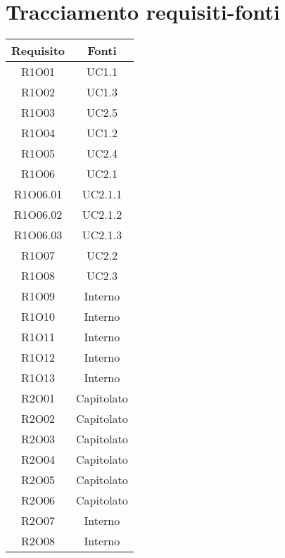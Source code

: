 \section{Tracciamento requisiti-fonti}
\begin{tabularx}{\textwidth}{|C|C|}
	\hline
	\textbf{Requisito} & \textbf{Fonti} \\
	\hline
	R1O01& UC1.1\\
	\hline
	R1O02& UC1.3\\
	\hline
	R1O03& UC2.5\\
	\hline
	R1O04& UC1.2\\
	\hline
	R1O05& UC2.4\\
	\hline
	R1O06& UC2.1\\
	\hline
	R1O06.01& UC2.1.1\\
	\hline
	R1O06.02& UC2.1.2\\
	\hline
	R1O06.03& UC2.1.3\\
	\hline
	R1O07& UC2.2\\
	\hline	
	R1O08& UC2.3\\
	\hline	
	R1O09& Interno\\
	\hline	
	R1O10& Interno\\
	\hline
	R1O11& Interno\\
	\hline	
	R1O12& Interno\\
	\hline
	R1O13& Interno\\
	\hline
	R2O01 &Capitolato\\
	\hline
	R2O02 &Capitolato\\
	\hline
	R2O03 &Capitolato\\
	\hline
	R2O04 &Capitolato\\
	\hline
	R2O05 &Capitolato\\
	\hline
	R2O06 &Capitolato\\
	\hline
	R2O07 &Interno\\
	\hline
	R2O08 &Interno\\
	\hline
\end{tabularx}